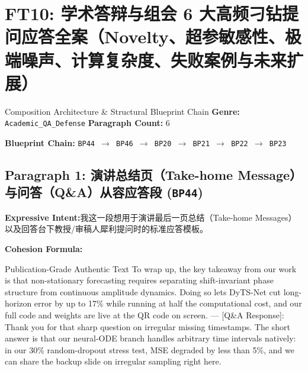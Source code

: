 \section{FT10: 学术答辩与组会 6 大高频刁钻提问应答全案（Novelty、超参敏感性、极端噪声、计算复杂度、失败案例与未来扩展）}\label{comp:FT10}
\begin{ConceptBox}{Composition Architecture \& Structural Blueprint Chain}
\textbf{Genre:} \texttt{Academic\_QA\_Defense} \quad \textbf{Paragraph Count:} 6\par
\textbf{Blueprint Chain:} \texttt{BP44 $\to$ BP46 $\to$ BP20 $\to$ BP21 $\to$ BP22 $\to$ BP23}
\end{ConceptBox}
\subsection*{Paragraph 1: 演讲总结页（Take-home Message）与问答（Q\&A）从容应答段 (\texttt{BP44})}
\noindent\textbf{Expressive Intent:}\enspace 我这一段想用于演讲最后一页总结（Take-home Messages）以及回答台下教授/审稿人犀利提问时的标准应答模板。\par
\noindent\textbf{Cohesion Formula:}\par\vspace{4pt}
\begin{ExampleBox}{Publication-Grade Authentic Text}
To wrap up, the key takeaway from our work is that non-stationary forecasting requires separating shift-invariant phase structure from continuous amplitude dynamics. Doing so lets DyTS-Net cut long-horizon error by up to 17\% while running at half the computational cost, and our full code and weights are live at the QR code on screen. --- [Q\&A Response]: Thank you for that sharp question on irregular missing timestamps. The short answer is that our neural-ODE branch handles arbitrary time intervals natively: in our 30\% random-dropout stress test, MSE degraded by less than 5\%, and we can share the backup slide on irregular sampling right here.
\end{ExampleBox}

